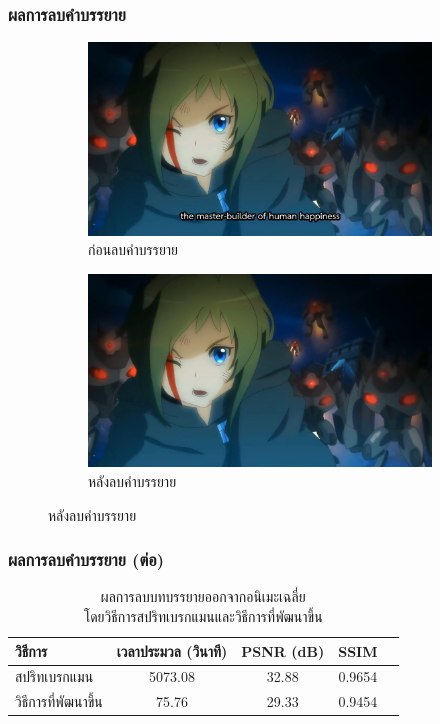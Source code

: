 \documentclass[xcolor=dvipsnames, xetex,serif]{beamer}
\numberwithin{equation}{section}
\begin{document}
	\begin{frame}
        \frametitle{ผลการลบคำบรรยาย}
        \begin{figure}[H]
            \centering
            \begin{subfigure}{0.4\linewidth}
                \centering
                \includegraphics[width=0.80\linewidth]{images/subtitle-remove/beforesubtitleremove.png}
                \caption{ก่อนลบคำบรรยาย}
                \label{image:ssim_location_prev}
            \end{subfigure}
            \begin{subfigure}{0.4\linewidth}
                \centering
                \includegraphics[width=0.80\linewidth]{images/subtitle-remove/aftersubtitleremove.png}
                \caption{หลังลบคำบรรยาย}
                \label{image:ssim_location_curr}
            \end{subfigure}
        \end{figure}
    \end{frame}
	\begin{frame}
        \frametitle{ผลการลบคำบรรยาย (ต่อ)}
        \begin{table}[H]
            \centering
            \captionsetup{justification=centering}
            \begin{tabular}[ht]{|l|c|c|c|c|}
                \hline
                วิธีการ  & เวลาประมวล  (วินาที) & PSNR (dB) & SSIM \\
                \hline
                สปริทเบรกแมน & 5073.08 & 32.88 & 0.9654 \\
                วิธีการที่พัฒนาขึ้น & 75.76 & 29.33 & 0.9454 \\
                \hline
            \end{tabular}
            \caption{ผลการลบบทบรรยายออกจากอนิเมะเฉลี่ย\\โดยวิธีการสปริทเบรกแมนและวิธีการที่พัฒนาขึ้น}
        \end{table}	
	\end{frame}
\end{document}
